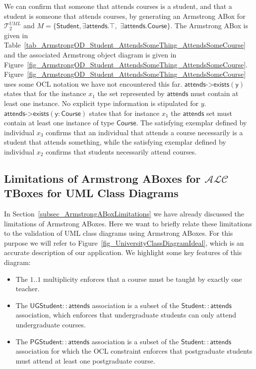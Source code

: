 \documentclass{amsart}
\begin{document}
  We can confirm that someone that attends courses is a student, and that a student is someone that attends courses, by generating an Armstrong ABox for $\mathcal{T}_2^{UML}$ and $M = \{\mathsf{Student}, \exists \mathsf{attends}.\top,$ $\exists \mathsf{attends}.\mathsf{Course}\}$. The Armstrong ABox is given in Table~\ref{tab_ArmstrongOD_Student_AttendsSomeThing_AttendsSomeCourse} and the associated Armstrong object diagram is given in Figure~\ref{fig_ArmstrongOD_Student_AttendsSomeThing_AttendsSomeCourse}.  Figure~\ref{fig_ArmstrongOD_Student_AttendsSomeThing_AttendsSomeCourse} uses some OCL notation we have not encountered this far. $\mathsf{attends}\texttt{->}\mathsf{exists(y)}$ states that for the instance $x_1$ the set represented by $\mathsf{attends}$ must contain at least one instance. No explicit type information is stipulated for $y$. $\mathsf{attends}\texttt{->}\mathsf{exists(y: Course)}$ states that for instance $x_1$ the $\mathsf{attends}$ set must contain at least one instance of type $\mathsf{Course}$.  
  The satisfying exemplar defined by individual $x_3$ confirms that an individual that attends a course necessarily is a student that attends something, while the satisfying exemplar defined by individual $x_2$ confirms that students necessarily attend courses.

  
 \subsection{Limitations of Armstrong ABoxes for $\mathcal{ALC}$ TBoxes for UML Class Diagrams}
 In Section~\ref{subsec_ArmstrongABoxLimitations} we have already discussed the limitations of Armstrong ABoxes. Here we want to briefly relate these limitations to the validation of UML class diagrams using Armstrong ABoxes. For this purpose we will refer to Figure~\ref{fig_UniversityClassDiagramIdeal}, which is an accurate description of our application. We highlight some key features of this diagram:
\begin{itemize}
	\item The $1..1$ multiplicity enforces that a course must be taught by exactly one teacher.
	\item The $\mathsf{UGStudent::attends}$ association is a subset of the $\mathsf{Student::attends}$ association, which enforces that undergraduate students can only attend undergraduate courses.
	\item The $\mathsf{PGStudent::attends}$ association is a subset of the $\mathsf{Student::attends}$ association for which the OCL constraint enforces that postgraduate students must attend at least one postgraduate course. 
\end{itemize}
\end{document}
